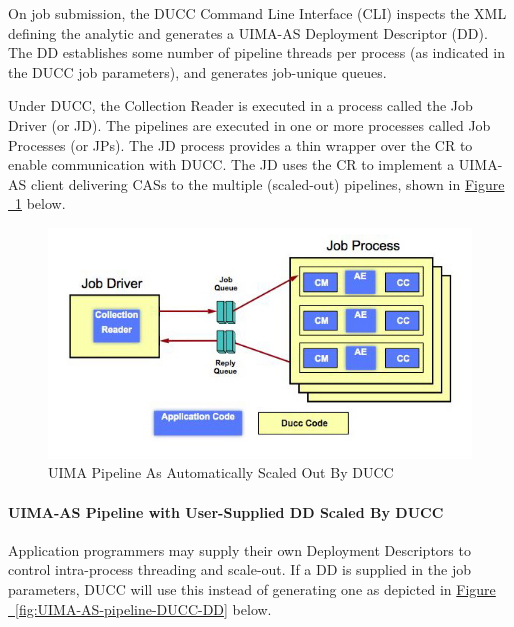     On job submission, the DUCC Command Line Interface (CLI) inspects the XML defining the analytic
    and generates a UIMA-AS Deployment Descriptor (DD).  The DD establishes some number of pipeline
    threads per process (as indicated in the DUCC job parameters), and generates job-unique queues.

    Under DUCC, the Collection Reader is executed in a process called the Job Driver (or JD). The 
    pipelines are executed in one or more processes called Job Processes (or JPs). The JD 
    process provides a thin wrapper over the CR to enable communication with DUCC.  The JD uses the
    CR to implement a UIMA-AS client delivering CASs to the multiple (scaled-out) pipelines, 
    shown in \hyperref[fig:UIMA-AS-pipeline-DUCC]{Figure ~\ref{fig:UIMA-AS-pipeline-DUCC}} below.

    \begin{figure}[H]
      \centering
      \includegraphics[width=5.5in]{images/ducc-sequential.jpg}
      \caption{UIMA Pipeline As Automatically Scaled Out By DUCC}
      \label{fig:UIMA-AS-pipeline-DUCC}
    \end{figure}

    \paragraph{UIMA-AS Pipeline with User-Supplied DD Scaled By DUCC}

    Application programmers may supply their own Deployment Descriptors to control intra-process
    threading and scale-out.  If a DD is supplied in the job parameters, DUCC will use this instead
    of generating one as depicted in \hyperref[fig:UIMA-AS-pipeline-DUCC-DD]{Figure ~\ref{fig:UIMA-AS-pipeline-DUCC-DD}} below.

